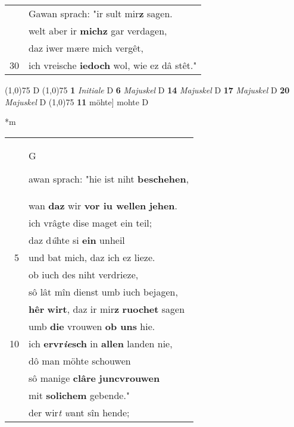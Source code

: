\documentclass[8pt,a4paper,notitlepage]{article}
\begin{document}
\begin{table}[ht]
\begin{minipage}[t]{0.5\linewidth}
\begin{tabular}{rl}
 & Gawan sprach: "ir sult mir\textbf{z} sagen.\\ 
 & welt aber ir \textbf{mich}\textbf{z} gar verdagen,\\ 
 & daz iwer mære mich vergêt,\\ 
30 & ich vreische \textbf{iedoch} wol, wie ez dâ stêt."\\ 
\end{tabular}
\scriptsize
\line(1,0){75} \newline
D \newline
\line(1,0){75} \newline
\textbf{1} \textit{Initiale} D  \textbf{6} \textit{Majuskel} D  \textbf{14} \textit{Majuskel} D  \textbf{17} \textit{Majuskel} D  \textbf{20} \textit{Majuskel} D  \newline
\line(1,0){75} \newline
\textbf{11} möhte] mohte D \newline
\end{minipage}
\hspace{0.5cm}
\begin{minipage}[t]{0.5\linewidth}
\small
\begin{center}*m
\end{center}
\begin{tabular}{rl}
 & \begin{large}G\end{large}awan sprach: "hie ist niht \textbf{beschehen},\\ 
 & wan \textbf{daz} wir \textbf{vor iu wellen} \textbf{jehen}.\\ 
 & ich vrâgte dise maget ein teil;\\ 
 & daz d\textit{û}hte si \textbf{ein} unheil\\ 
5 & und bat mich, daz ich ez lieze.\\ 
 & ob iuch des niht verdrieze,\\ 
 & sô lât mîn dienst umb iuch bejagen,\\ 
 & \textbf{hêr} \textbf{wirt}, daz ir mir\textbf{z} \textbf{ruochet} sagen\\ 
 & umb \textbf{die} vrouwen \textbf{ob uns} hie.\\ 
10 & ich \textbf{ervr\textit{ie}sch} in \textbf{allen} landen nie,\\ 
 & dô man möhte schouwen\\ 
 & sô manige \textbf{clâre} \textbf{juncvrouwen}\\ 
 & mit \textbf{solichem} gebende."\\ 
 & der wir\textit{t} \textit{w}ant sîn hende;\\ 

\end{tabular}
\end{minipage}
\end{table}
\end{document}
